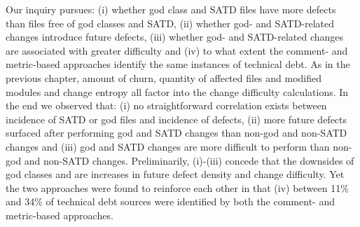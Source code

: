 Our inquiry pursues: (i) whether god class and SATD files have more defects than files free of god classes and SATD, (ii) whether god- and SATD-related changes introduce future defects, (iii) whether god- and SATD-related changes are associated with greater difficulty and (iv) to what extent the comment- and metric-based approaches identify the same instances of technical debt. As in the previous chapter, amount of churn, quantity of affected files and modified modules and change entropy all factor into the change difficulty calculations. In the end we observed that: (i) no straightforward correlation exists between incidence of SATD or god files and incidence of defects, (ii) more future defects surfaced after performing god and SATD changes than non-god and non-SATD changes and (iii) god and SATD changes are more difficult to perform than non-god and non-SATD changes. Preliminarily, (i)-(iii) concede that the downsides of god classes and \SATD are increases in future defect density and change difficulty. Yet the two approaches were found to reinforce each other in that (iv) between 11\% and 34\% of technical debt sources were identified by both the comment- and metric-based approaches.



